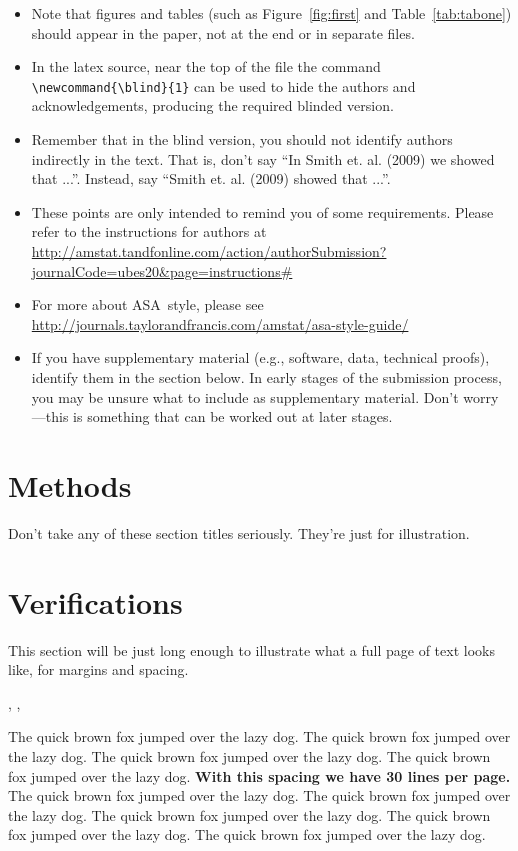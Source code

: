 \documentclass[12pt]{article}
\newcommand{\blind}{0}
\begin{document}
\begin{itemize}
\item Note that figures and tables (such as Figure~\ref{fig:first} and
Table~\ref{tab:tabone}) should appear in the paper, not at the end or
in separate files.
\item In the latex source, near the top of the file the command
\verb+\newcommand{\blind}{1}+ can be used to hide the authors and
acknowledgements, producing the required blinded version.
\item Remember that in the blind version, you should not identify authors
indirectly in the text.  That is, don't say ``In Smith et. al.  (2009) we
showed that ...''.  Instead, say ``Smith et. al. (2009) showed that ...''.
\item These points are only intended to remind you of some requirements.
Please refer to the instructions for authors
at \url{http://amstat.tandfonline.com/action/authorSubmission?journalCode=ubes20&page=instructions#}
\item For more about ASA\ style, please see \url{http://journals.taylorandfrancis.com/amstat/asa-style-guide/}
\item If you have supplementary material (e.g., software, data, technical
proofs), identify them in the section below.  In early stages of the
submission process, you may be unsure what to include as supplementary
material.  Don't worry---this is something that can be worked out at later stages.
\end{itemize}

\section{Methods}
\label{sec:meth}
Don't take any of these section titles seriously.  They're just for
illustration.

\section{Verifications}
\label{sec:verify}
This section will be just long enough to illustrate what a full page of
text looks like, for margins and spacing.


\cite{Campbell02}, \cite{Schubert13}, \cite{Chi81}


The quick brown fox jumped over the lazy dog.
The quick brown fox jumped over the lazy dog.
The quick brown fox jumped over the lazy dog.
The quick brown fox jumped over the lazy dog.
{\bf With this spacing we have 30 lines per page.}
The quick brown fox jumped over the lazy dog.
The quick brown fox jumped over the lazy dog.
The quick brown fox jumped over the lazy dog.
The quick brown fox jumped over the lazy dog.
The quick brown fox jumped over the lazy dog.
\end{document}
